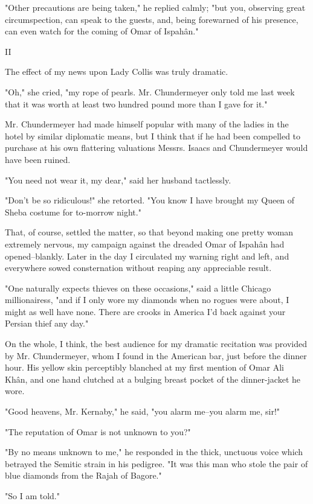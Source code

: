 "Other precautions are being taken," he replied calmly; "but you,
observing great circumspection, can speak to the guests, and, being
forewarned of his presence, can even watch for the coming of Omar of
Ispahân."


II

The effect of my news upon Lady Collis was truly dramatic.

"Oh," she cried, "my rope of pearls. Mr. Chundermeyer only told me
last week that it was worth at least two hundred pound more than I
gave for it."

Mr. Chundermeyer had made himself popular with many of the ladies in
the hotel by similar diplomatic means, but I think that if he had been
compelled to purchase at his own flattering valuations Messrs. Isaacs
and Chundermeyer would have been ruined.

"You need not wear it, my dear," said her husband tactlessly.

"Don't be so ridiculous!" she retorted. "You know I have brought my
Queen of Sheba costume for to-morrow night."

That, of course, settled the matter, so that beyond making one pretty
woman extremely nervous, my campaign against the dreaded Omar of
Ispahân had opened--blankly. Later in the day I circulated my warning
right and left, and everywhere sowed consternation without reaping any
appreciable result.

"One naturally expects thieves on these occasions," said a little
Chicago millionairess, "and if I only wore my diamonds when no rogues
were about, I might as well have none. There are crooks in America I'd
back against your Persian thief any day."

On the whole, I think, the best audience for my dramatic recitation
was provided by Mr. Chundermeyer, whom I found in the American bar,
just before the dinner hour. His yellow skin perceptibly blanched at
my first mention of Omar Ali Khân, and one hand clutched at a bulging
breast pocket of the dinner-jacket he wore.

"Good heavens, Mr. Kernaby," he said, "you alarm me--you alarm me,
sir!"

"The reputation of Omar is not unknown to you?"

"By no means unknown to me," he responded in the thick, unctuous voice
which betrayed the Semitic strain in his pedigree. "It was this man
who stole the pair of blue diamonds from the Rajah of Bagore."

"So I am told."

